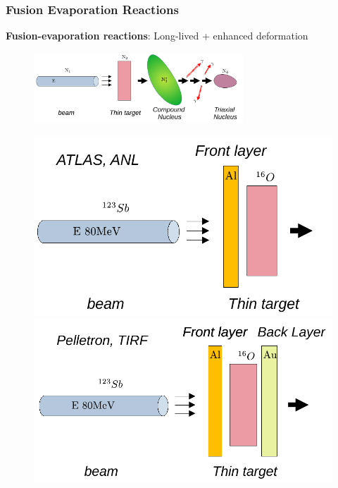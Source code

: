 \documentclass{beamer}
\begin{document}
\begin{frame}
	\frametitle{Fusion Evaporation Reactions}
	\textbf{Fusion-evaporation reactions}: {\color{red}Long-lived} + {\color{red}enhanced deformation}
	\begin{figure}
        \centering
        \includegraphics[width=0.7\textwidth]{figures/fusion-evaporation.pdf}
    \end{figure}
	\begin{figure}
		\centering
		\includegraphics[scale=0.4]{figures/beam-sandwich.pdf}
		\includegraphics[scale=0.4]{figures/beam-sandwich-2.pdf}
	\end{figure}
\end{frame}
\end{document}
